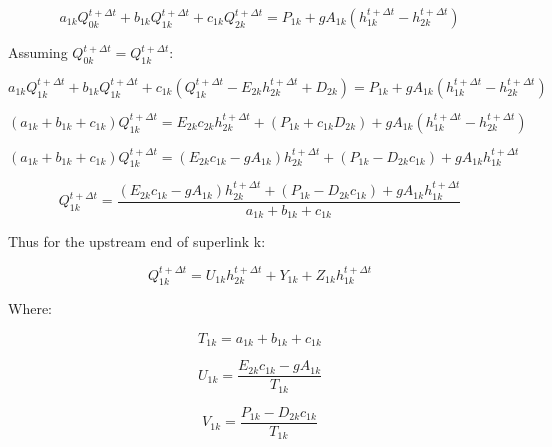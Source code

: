 \documentclass[11pt]{article}
\begin{document}
\begin{equation}
   a_{1k} Q_{0k}^{t + \Delta t} + b_{1k} Q_{1k}^{t + \Delta t} + c_{1k} Q_{2k}^{t + \Delta t} = P_{1k} + g A_{1k} (h_{1k}^{t + \Delta t} - h_{2k}^{t + \Delta t})
\end{equation}

Assuming $Q_{0k}^{t + \Delta t} = Q_{1k}^{t + \Delta t}$:

\begin{equation}
  a_{1k} Q_{1k}^{t + \Delta t} + b_{1k} Q_{1k}^{t + \Delta t} + c_{1k} (Q_{1k}^{t + \Delta t} - E_{2k} h_{2k}^{t + \Delta t} + D_{2k}) = P_{1k} + g A_{1k} (h_{1k}^{t + \Delta t} - h_{2k}^{t + \Delta t})
\end{equation}

\begin{equation}
  (a_{1k} + b_{1k} + c_{1k}) Q_{1k}^{t + \Delta t} = E_{2k} c_{2k} h_{2k}^{t + \Delta t} + (P_{1k} + c_{1k} D_{2k}) + g A_{1k} (h_{1k}^{t + \Delta t} - h_{2k}^{t + \Delta t})
\end{equation}

\begin{equation}
  (a_{1k} + b_{1k} + c_{1k}) Q_{1k}^{t + \Delta t} = ( E_{2k} c_{1k} - g A_{1k} ) h_{2k}^{t + \Delta t} + (P_{1k} -  D_{2k} c_{1k}) + g A_{1k} h_{1k}^{t + \Delta t}
\end{equation}


\begin{equation}
   Q_{1k}^{t + \Delta t} = \frac{( E_{2k} c_{1k} - g A_{1k} ) h_{2k}^{t + \Delta t} + (P_{1k} -  D_{2k} c_{1k}) + g A_{1k} h_{1k}^{t + \Delta t}}{a_{1k} + b_{1k} + c_{1k}}
\end{equation}

Thus for the upstream end of superlink k:

\begin{equation}
  \boxed{
  Q_{1k}^{t + \Delta t} = U_{1k} h_{2k}^{t + \Delta t} + Y_{1k} + Z_{1k} h_{1k}^{t + \Delta t}
  }
\end{equation}

Where:

\begin{equation}
  \boxed{
  T_{1k} = a_{1k} + b_{1k} + c_{1k}
  }
\end{equation}

\begin{equation}
  \boxed{
  U_{1k} = \frac{E_{2k} c_{1k} - g A_{1k}}{T_{1k}}
  }
\end{equation}

\begin{equation}
  \boxed{
  V_{1k} = \frac{P_{1k} -  D_{2k} c_{1k}}{T_{1k}}
  } 
\end{equation}
\end{document}

